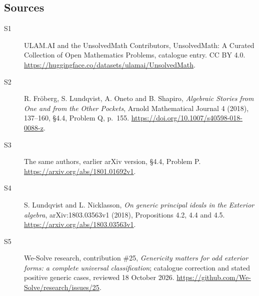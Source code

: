 \documentclass[11pt]{article}
\begin{document}
\subsection{Sources}
\begin{description}
\item[\hypertarget{source:statement:1}{S1}] ULAM.AI and the UnsolvedMath Contributors, UnsolvedMath: A Curated Collection of Open Mathematics Problems, catalogue entry. CC BY 4.0. \url{https://huggingface.co/datasets/ulamai/UnsolvedMath}.
\item[\hypertarget{source:statement:2}{S2}] R. Fröberg, S. Lundqvist, A. Oneto and B. Shapiro, \emph{Algebraic Stories from One and from the Other Pockets}, Arnold Mathematical Journal 4 (2018), 137--160, §4.4, Problem Q, p.~155. \url{https://doi.org/10.1007/s40598-018-0088-z}.
\item[\hypertarget{source:statement:3}{S3}] The same authors, earlier arXiv version, §4.4, Problem P. \url{https://arxiv.org/abs/1801.01692v1}.
\item[\hypertarget{source:statement:4}{S4}] S. Lundqvist and L. Nicklasson, \emph{On generic principal ideals in the Exterior algebra}, arXiv:1803.03563v1 (2018), Propositions 4.2, 4.4 and 4.5. \url{https://arxiv.org/abs/1803.03563v1}.
\item[\hypertarget{source:statement:5}{S5}] We-Solve research, contribution \#25, \emph{Genericity matters for odd exterior forms: a complete universal classification}; catalogue correction and stated positive generic cases, reviewed 18 October 2026. \url{https://github.com/We-Solve/research/issues/25}.
\end{description}
\label{end:statement}
\end{document}
